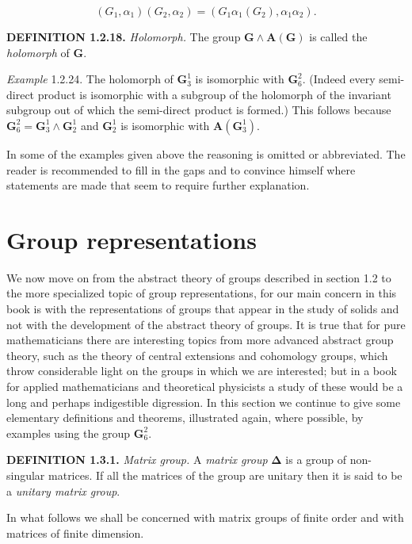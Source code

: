 \documentclass[11pt,a4paper,twoside,openright]{book}
\begin{document}
\begin{equation*}
(G_{1}, \alpha_{1})(G_{2}, \alpha_{2}) = (G_{1}\alpha_{1}(G_{2}), \alpha_{1}\alpha_{2}). \tag{1.2.6}
\end{equation*}

\textbf{DEFINITION 1.2.18.} \textit{Holomorph.} The group $\mathbf{G} \wedge \mathbf{A}(\mathbf{G})$ is called the \textit{holomorph} of $\mathbf{G}$.

\textit{Example} 1.2.24. The holomorph of $\mathbf{G}_3^1$ is isomorphic with $\mathbf{G}_6^2$. (Indeed every semi-direct product is isomorphic with a subgroup of the holomorph of the invariant subgroup out of which the semi-direct product is formed.) This follows because $\mathbf{G}_6^2 = \mathbf{G}_3^1 \wedge \mathbf{G}_2^1$ and $\mathbf{G}_2^1$ is isomorphic with $\mathbf{A}(\mathbf{G}_3^1)$.

In some of the examples given above the reasoning is omitted or abbreviated. The reader is recommended to fill in the gaps and to convince himself where statements are made that seem to require further explanation.

\section{Group representations}

We now move on from the abstract theory of groups described in section 1.2 to the more specialized topic of group representations, for our main concern in this book is with the representations of groups that appear in the study of solids and not with the development of the abstract theory of groups. It is true that for pure mathematicians there are interesting topics from more advanced abstract group theory, such as the theory of central extensions and cohomology groups, which throw considerable light on the groups in which we are interested; but in a book for applied mathematicians and theoretical physicists a study of these would be a long and perhaps indigestible digression. In this section we continue to give some elementary definitions and theorems, illustrated again, where possible, by examples using the group $\mathbf{G}_6^2$.

\textbf{DEFINITION 1.3.1.} \textit{Matrix group.} A \textit{matrix group} $\boldsymbol{\Delta}$ is a group of non-singular matrices. If all the matrices of the group are unitary then it is said to be a \textit{unitary matrix group}.

In what follows we shall be concerned with matrix groups of finite order and with matrices of finite dimension.
\end{document}
